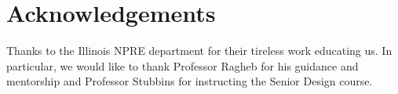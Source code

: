 \documentclass[12pt]{article}
\begin{document}
\section{Acknowledgements}
Thanks to the Illinois NPRE department for their tireless work educating us. In particular, we would like to thank Professor Ragheb for his guidance and mentorship and Professor Stubbins for instructing the Senior Design course.



\end{document}
